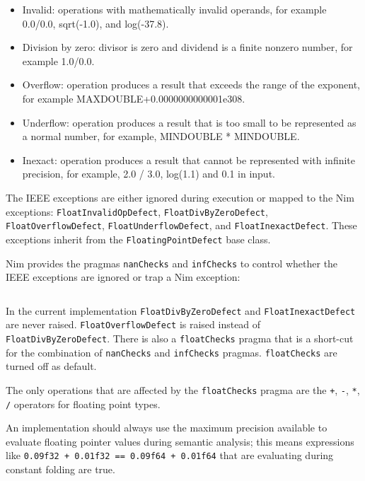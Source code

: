 \begin{itemize}
\tightlist
\item
  Invalid: operations with mathematically invalid operands, for example
  0.0/0.0, sqrt(-1.0), and log(-37.8).
\item
  Division by zero: divisor is zero and dividend is a finite nonzero
  number, for example 1.0/0.0.
\item
  Overflow: operation produces a result that exceeds the range of the
  exponent, for example MAXDOUBLE+0.0000000000001e308.
\item
  Underflow: operation produces a result that is too small to be
  represented as a normal number, for example, MINDOUBLE * MINDOUBLE.
\item
  Inexact: operation produces a result that cannot be represented with
  infinite precision, for example, 2.0 / 3.0, log(1.1) and 0.1 in input.
\end{itemize}

The IEEE exceptions are either ignored during execution or mapped to the
Nim exceptions: \texttt{FloatInvalidOpDefect},
\texttt{FloatDivByZeroDefect}, \texttt{FloatOverflowDefect},
\texttt{FloatUnderflowDefect}, and \texttt{FloatInexactDefect}. These
exceptions inherit from the \texttt{FloatingPointDefect} base class.

Nim provides the pragmas \texttt{nanChecks} and \texttt{infChecks} to
control whether the IEEE exceptions are ignored or trap a Nim exception:

\begin{verbatim}
\end{verbatim}

In the current implementation \texttt{FloatDivByZeroDefect} and
\texttt{FloatInexactDefect} are never raised.
\texttt{FloatOverflowDefect} is raised instead of
\texttt{FloatDivByZeroDefect}. There is also a \texttt{floatChecks}
pragma that is a short-cut for the combination of \texttt{nanChecks} and
\texttt{infChecks} pragmas. \texttt{floatChecks} are turned off as
default.

The only operations that are affected by the \texttt{floatChecks} pragma
are the \texttt{+}, \texttt{-}, \texttt{*}, \texttt{/} operators for
floating point types.

An implementation should always use the maximum precision available to
evaluate floating pointer values during semantic analysis; this means
expressions like
\texttt{0.09\textquotesingle{}f32\ +\ 0.01\textquotesingle{}f32\ ==\ 0.09\textquotesingle{}f64\ +\ 0.01\textquotesingle{}f64}
that are evaluating during constant folding are true.

